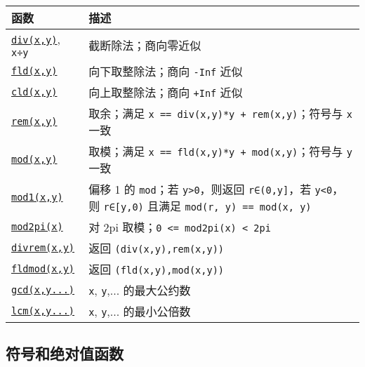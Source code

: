 \begin{table}[h]

\begin{tabulary}{\linewidth}{|L|L|}
\hline
函数 & 描述 \\
\hline
\hyperlink{8020976424566491334}{\texttt{div(x,y)}}, \texttt{x÷y} & 截断除法；商向零近似 \\
\hline
\hyperlink{15067916827074788527}{\texttt{fld(x,y)}} & 向下取整除法；商向 \texttt{-Inf} 近似 \\
\hline
\hyperlink{7922388465305816555}{\texttt{cld(x,y)}} & 向上取整除法；商向 \texttt{+Inf} 近似 \\
\hline
\hyperlink{3827563084771191385}{\texttt{rem(x,y)}} & 取余；满足 \texttt{x == div(x,y)*y + rem(x,y)}；符号与 \texttt{x} 一致 \\
\hline
\hyperlink{2082041235715276573}{\texttt{mod(x,y)}} & 取模；满足 \texttt{x == fld(x,y)*y + mod(x,y)}；符号与 \texttt{y} 一致 \\
\hline
\hyperlink{13778479217547823795}{\texttt{mod1(x,y)}} & 偏移 1 的 \texttt{mod}；若 \texttt{y>0}，则返回 \texttt{r∈(0,y]}，若 \texttt{y<0}，则 \texttt{r∈[y,0)} 且满足 \texttt{mod(r, y) == mod(x, y)} \\
\hline
\hyperlink{15322754370885673769}{\texttt{mod2pi(x)}} & 对 2pi 取模；\texttt{0 <= mod2pi(x) < 2pi} \\
\hline
\hyperlink{6106909621813654214}{\texttt{divrem(x,y)}} & 返回 \texttt{(div(x,y),rem(x,y))} \\
\hline
\hyperlink{2806360720034558325}{\texttt{fldmod(x,y)}} & 返回 \texttt{(fld(x,y),mod(x,y))} \\
\hline
\hyperlink{15906911311436241979}{\texttt{gcd(x,y...)}} & \texttt{x}, \texttt{y},... 的最大公约数 \\
\hline
\hyperlink{12975400110924105221}{\texttt{lcm(x,y...)}} & \texttt{x}, \texttt{y},... 的最小公倍数 \\
\hline
\end{tabulary}

\end{table}



\hypertarget{1398763230003382412}{}


\subsection{符号和绝对值函数}





